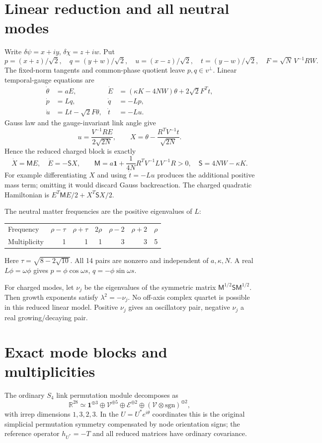 \documentclass[11pt,a4paper]{article}
\newcommand{\id}{\mathbf1}\newcommand{\tr}{\operatorname{tr}}\newcommand{\diag}{\operatorname{diag}}\newcommand{\Rea}{\operatorname{Re}}
\begin{document}
\section{Linear reduction and all neutral modes}
Write $\delta\psi=x+iy$, $\delta\chi=z+iw$. Put
\[
p=(x+z)/\sqrt2,\quad q=(y+w)/\sqrt2,\quad
u=(x-z)/\sqrt2,\quad t=(y-w)/\sqrt2,
\quad F=\sqrt N\,V^{-1}RW.
\]
The fixed-norm tangents and common-phase quotient leave $p,q\in v^\perp$. Linear temporal-gauge equations are
\begin{align*}
\dot\theta&=aE,&\dot E&=(\kappa K-4NW)\theta+2\sqrt2 F^Tt,\\
\dot p&=Lq,&\dot q&=-Lp,\\
\dot u&=Lt-\sqrt2 F\theta,&\dot t&=-Lu.
\end{align*}
Gauss law and the gauge-invariant link angle give
\[
u=\frac{V^{-1}RE}{2\sqrt{2N}},\qquad
X=\theta-\frac{R^TV^{-1}t}{\sqrt{2N}}.
\]
Hence the reduced charged block is exactly
\begin{equation}
\boxed{\dot X=\mathsf M E,\quad\dot E=-\mathsf S X,\qquad
\mathsf M=a\id+\frac1{4N}R^TV^{-1}LV^{-1}R>0,\quad
\mathsf S=4NW-\kappa K.}\label{eq:charged}
\end{equation}
For example differentiating $X$ and using $\dot t=-Lu$ produces the additional positive mass term; omitting it would discard Gauss backreaction. The charged quadratic Hamiltonian is
$E^T\mathsf M E/2+X^T\mathsf S X/2$.

The neutral matter frequencies are the positive eigenvalues of $L$:
\begin{center}
\begin{tabular}{lrrrrrr}
\toprule
Frequency & $\rho-\tau$ & $\rho+\tau$ & $2\rho$ & $\rho-2$ & $\rho+2$ & $\rho$\\
Multiplicity & 1 & 1 & 1 & 3 & 3 & 5\\
\bottomrule
\end{tabular}
\end{center}
Here $\tau=\sqrt{8-2\sqrt{10}}$. All 14 pairs are nonzero and independent of $a,\kappa,N$. A real $L\phi=\omega\phi$ gives $p=\phi\cos\omega s$, $q=-\phi\sin\omega s$.

For charged modes, let $\nu_j$ be the eigenvalues of the symmetric matrix
$\mathsf M^{1/2}\mathsf S\mathsf M^{1/2}$. Then growth exponents satisfy $\lambda^2=-\nu_j$. No off-axis complex quartet is possible in this reduced linear model. Positive $\nu_j$ gives an oscillatory pair, negative $\nu_j$ a real growing/decaying pair.

\newpage
\section{Exact mode blocks and multiplicities}
The ordinary $S_4$ link permutation module decomposes as
\[
\mathbb R^{28}\simeq\mathbf1^{\oplus3}\oplus
\mathcal V^{\oplus5}\oplus\mathcal E^{\oplus2}\oplus
(\mathcal V\otimes\mathrm{sgn})^{\oplus2},
\]
with irrep dimensions $1,3,2,3$. In the $U=U^*e^{i\theta}$ coordinates this is the original simplicial permutation symmetry compensated by node orientation signs; the reference operator $h_{U^*}=-T$ and all reduced matrices have ordinary covariance.
\end{document}
